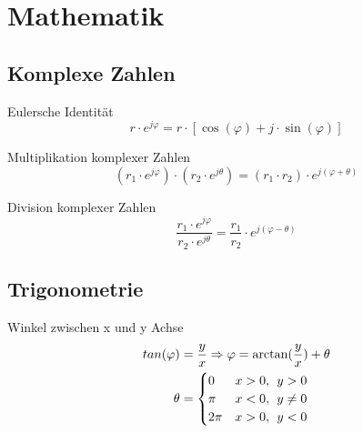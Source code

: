 \documentclass[11pt, a4paper, final, fleqn, twocolumn]{article}
\numberwithin{equation}{subsection}
\begin{document}



\section{Mathematik}

\subsection{Komplexe Zahlen}

Eulersche Identität
\begin{equation}
    r \cdot e^{j\varphi} = r \cdot [\cos(\varphi) + j \cdot \sin(\varphi)]
\end{equation}

\noindent Multiplikation komplexer Zahlen
\begin{equation}
    (r_1 \cdot e^{j\varphi}) \cdot (r_2 \cdot e^{j\theta}) = (r_1 \cdot r_2) \cdot e^{j(\varphi + \theta)}
\end{equation}

\noindent Division komplexer Zahlen
\begin{equation}
    \frac{r_1 \cdot e^{j\varphi}}{r_2 \cdot e^{j\theta}} = \frac{r_1}{r_2} \cdot e^{j(\varphi - \theta)}
\end{equation}


\subsection{Trigonometrie}

Winkel zwischen x und y Achse
\begin{equation}
\begin{split}
    tan(\varphi) & = \frac{y}{x} \Rightarrow \varphi = \arctan(\frac{y}{x})+\theta \\
    \theta & = 
    \begin{cases}
        0 & x > 0, \hspace{1ex} y > 0 \\
        \pi & x < 0, \hspace{1ex} y \neq  0 \\
        2\pi & x > 0, \hspace{1ex} y < 0
    \end{cases}
\end{split}
\end{equation}
\end{document}
